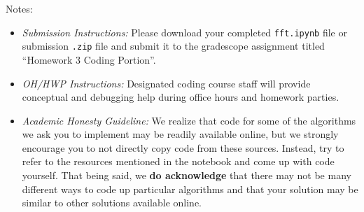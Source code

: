 \documentclass[11pt]{article}
\begin{document}
\noindent Notes:
\begin{itemize}
    \item \textit{Submission Instructions:} Please download your completed \texttt{fft.ipynb} file or submission \texttt{.zip} file and submit it to the gradescope assignment titled ``Homework 3 Coding Portion''. 
    
    \item \textit{OH/HWP Instructions:} Designated coding course staff will provide conceptual and debugging help during office hours and homework parties.
    
    \item \textit{Academic Honesty Guideline:} We realize that code for some of the algorithms we ask you to implement may be readily available online, but we strongly encourage you to not directly copy code from these sources. Instead, try to refer to the resources mentioned in the notebook and come up with code yourself. That being said, we \textbf{do acknowledge} that there may not be many different ways to code up particular algorithms and that your solution may be similar to other solutions available online.
    
\end{itemize}
\end{document}
